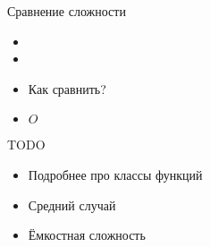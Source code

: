 \documentclass[aspectratio=169,14pt]{beamer}
\begin{document}
    \begin{frame}{Сравнение сложности}
        \begin{itemize}
            \item<1-> 
            \item<1-> 
            \item<2-> Как сравнить?
            \item $O$
        \end{itemize}
    \end{frame}

    \begin{frame}{TODO}
        \begin{itemize}
            \item Подробнее про классы функций
            \item Средний случай
            \item Ёмкостная сложность
        \end{itemize}
    \end{frame}

    \qnaframe
\end{document}
